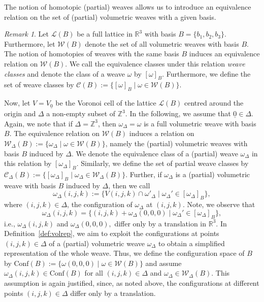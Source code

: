 \documentclass[12pt]{article}
\theoremstyle{definition}
\theoremstyle{remark}
\newtheorem{remark}[theorem]{Remark}
\begin{document}
The notion of homotopic (partial) weaves allows us to introduce an equivalence relation on the set of (partial) volumetric weaves with a given basis.
\begin{remark}\label{remark:equi}
Let $\mathcal{L}(B)$ be a full lattice in $\mathbb{R}^3$ with basis $B=\{b_1,b_2,b_3\}.$ Furthermore, let $\mathcal{W}(B)$ denote the set
of all volumetric weaves with basis $B$. The notion of homotopies of weaves with the same basis $B$ induces an equivalence relation on $\mathcal{W}(B)$.
We call the equivalence classes under this relation \emph{weave classes} and denote the class of a weave $\omega$ by $[\omega]_B$.
Furthermore, we define the set of weave classes by $\mathcal{C}(B):=\{[\omega]_B\mid \omega\in \mathcal{W}(B)\}$.

Now, let $V=V_{\underline{0}}$ be the Voronoi cell of the lattice $\mathcal{L}(B)$ centred around the origin and ${\Delta}$ a non-empty subset of $\mathbb{Z}^3$.
In the following, we assume that $\underline{0}\in {\Delta}$. Again, we note that if ${\Delta}=\mathbb{Z}^3$, then $\omega_{\Delta}=\omega$ is a full volumetric weave with basis $B.$ The equivalence relation on $\mathcal{W}(B)$ induces a relation on $\mathcal{W}_{\Delta}(B):=\{\omega_{\Delta}\mid \omega \in \mathcal{W}(B)\}$, namely the (partial) volumetric weaves with basis $B$ induced by ${\Delta}$.
We denote the equivalence class of a (partial) weave $\omega_{\Delta}$ in this relation by $[\omega_{\Delta}]_B$. Similarly, we define the set of partial weave classes by $\mathcal{C}_{\Delta}(B):=\{[\omega_{\Delta}]_B\mid \omega_{\Delta}\in \mathcal{W}_{\Delta}(B)\}$.
Further, if $\omega_{\Delta}$ is a (partial) volumetric weave with basis $B$ induced by ${\Delta}$, then we call $$\omega_{\Delta}(i,j,k):=\{V(i,j,k)\cap \omega'_{\Delta}\mid \omega_{\Delta}'\in [\omega_{\Delta}]_B\},$$ where $(i,j,k)\in {\Delta}$, the configuration of $\omega_{\Delta}$ at $(i,j,k).$
Note, we observe that $$\omega_{\Delta}(i,j,k) =\{(i,j,k) + \omega_{\Delta}(0,0,0)\mid \omega_{\Delta}'\in [\omega_{\Delta}]_B\},$$ i.e., $\omega_{\Delta}(i,j,k)$ and $\omega_{{\Delta}}(0,0,0),$ differ only by a translation in $\mathbb{R}^3.$ In Definition~\ref{def:volrep}, we aim to exploit the configurations at points $(i,j,k)\in {\Delta}$ of a (partial) volumetric weave $\omega_{\Delta}$ to obtain a simplified representation of the whole weave. Thus, we define the configuration space of $B$ by $\mathrm{Conf}(B):=\{\omega(0,0,0)\mid \omega\in \mathcal{W}(B)\}$
and assume $\omega_{\Delta}(i,j,k)\in \mathrm{Conf}(B)$ for all $(i,j,k)\in {\Delta}$ and $\omega_{\Delta}\in \mathcal{W}_{\Delta}(B).$ This assumption is again justified, since, as noted above, the configurations at different points $(i,j,k)\in {\Delta}$ differ only by a translation.
\end{remark}
\end{document}

